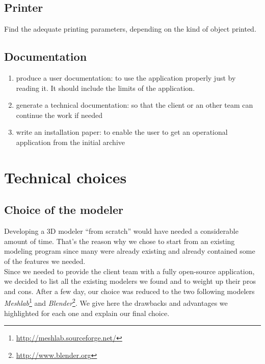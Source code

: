 \documentclass{report}
\begin{document}
\subsection{Printer}

Find the adequate printing parameters, depending on the kind of object printed.

\subsection{Documentation}

\begin{enumerate}
\item produce a user documentation: to use the application properly just by reading it. It should include the limits of the application.
\item generate a technical documentation: so that the client or an other team can continue the work if needed
\item write an installation paper: to enable the user to get an operational application from the initial archive
\end{enumerate}



\section{Technical choices}

\subsection{Choice of the modeler}

Developing a 3D modeler ``from scratch'' would have needed a considerable amount of time. That's the reason why we chose to start from an existing modeling program since many were already existing and already contained some of the features we needed.\\

Since we needed to provide the client team with a fully open-source application, we decided to list all the existing modelers we found and to weight up their pros and cons. After a few day, our choice was reduced to the two following modelers \emph{Meshlab}\footnote{\url{http://meshlab.sourceforge.net/}} and \emph{Blender}\footnote{\url{http://www.blender.org}}. We give here the drawbacks and advantages we highlighted for each one and explain our final choice.

\bigskip
\end{document}
